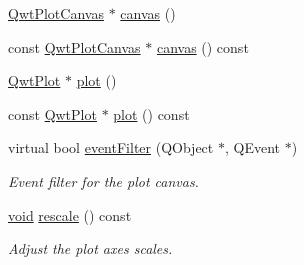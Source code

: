 \begin{DoxyCompactItemize}
\item 
\hyperlink{class_qwt_plot_canvas}{Qwt\-Plot\-Canvas} $\ast$ \hyperlink{class_qwt_plot_rescaler_ada001d0704f9f097c5737dcdc594d738}{canvas} ()
\item 
const \hyperlink{class_qwt_plot_canvas}{Qwt\-Plot\-Canvas} $\ast$ \hyperlink{class_qwt_plot_rescaler_a55d9e2c04c33b866f839288a532c17d1}{canvas} () const 
\item 
\hyperlink{class_qwt_plot}{Qwt\-Plot} $\ast$ \hyperlink{class_qwt_plot_rescaler_aca7a946dd53744e4640be383cd161a7c}{plot} ()
\item 
const \hyperlink{class_qwt_plot}{Qwt\-Plot} $\ast$ \hyperlink{class_qwt_plot_rescaler_ae49ce39ba8c7670bd8f70cf9078d96d5}{plot} () const 
\item 
virtual bool \hyperlink{class_qwt_plot_rescaler_a2a6809f3940b9114a1faed30f6edc3d0}{event\-Filter} (Q\-Object $\ast$, Q\-Event $\ast$)
\begin{DoxyCompactList}\small\item\em Event filter for the plot canvas. \end{DoxyCompactList}\item 
\hyperlink{group___u_a_v_objects_plugin_ga444cf2ff3f0ecbe028adce838d373f5c}{void} \hyperlink{class_qwt_plot_rescaler_afd6783b36fa0a2f61b481bffc5f33251}{rescale} () const 
\begin{DoxyCompactList}\small\item\em Adjust the plot axes scales. \end{DoxyCompactList}\end{DoxyCompactItemize}
